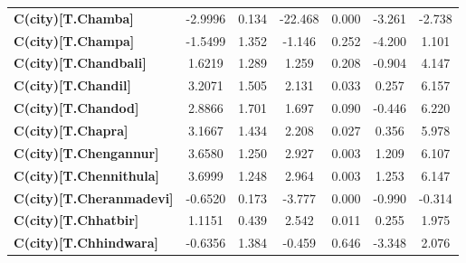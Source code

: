\begin{center}
\begin{tabular}{lcccccc}
\textbf{C(city)[T.Chamba]}                                                                          &      -2.9996  &        0.134     &   -22.468  &         0.000        &       -3.261    &       -2.738     \\
\textbf{C(city)[T.Champa]}                                                                          &      -1.5499  &        1.352     &    -1.146  &         0.252        &       -4.200    &        1.101     \\
\textbf{C(city)[T.Chandbali]}                                                                       &       1.6219  &        1.289     &     1.259  &         0.208        &       -0.904    &        4.147     \\
\textbf{C(city)[T.Chandil]}                                                                         &       3.2071  &        1.505     &     2.131  &         0.033        &        0.257    &        6.157     \\
\textbf{C(city)[T.Chandod]}                                                                         &       2.8866  &        1.701     &     1.697  &         0.090        &       -0.446    &        6.220     \\
\textbf{C(city)[T.Chapra]}                                                                          &       3.1667  &        1.434     &     2.208  &         0.027        &        0.356    &        5.978     \\
\textbf{C(city)[T.Chengannur]}                                                                      &       3.6580  &        1.250     &     2.927  &         0.003        &        1.209    &        6.107     \\
\textbf{C(city)[T.Chennithula]}                                                                     &       3.6999  &        1.248     &     2.964  &         0.003        &        1.253    &        6.147     \\
\textbf{C(city)[T.Cheranmadevi]}                                                                    &      -0.6520  &        0.173     &    -3.777  &         0.000        &       -0.990    &       -0.314     \\
\textbf{C(city)[T.Chhatbir]}                                                                        &       1.1151  &        0.439     &     2.542  &         0.011        &        0.255    &        1.975     \\
\textbf{C(city)[T.Chhindwara]}                                                                      &      -0.6356  &        1.384     &    -0.459  &         0.646        &       -3.348    &        2.076     \\

\end{tabular}
\end{center}
